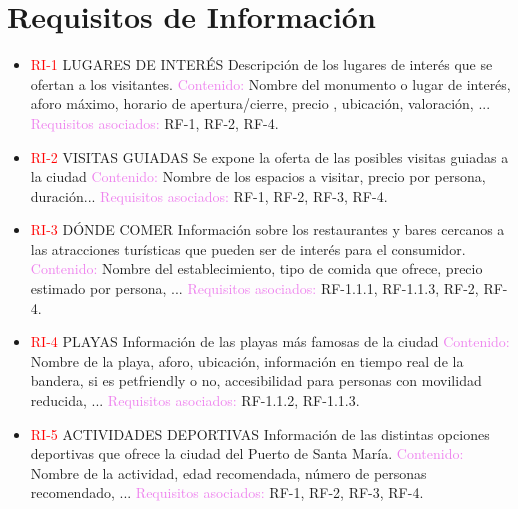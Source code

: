\chapter{Requisitos de Informaci\'on}
\begin{itemize}
    \item \textcolor{red}{RI-1} LUGARES DE INTERÉS \newline
    Descripción de los lugares de interés que se ofertan a los visitantes. \newline
    \textcolor{violet}{Contenido:} Nombre del monumento o lugar de interés, aforo máximo, horario de apertura/cierre, precio , ubicación, valoración, ...\newline
    \textcolor{violet}{Requisitos asociados:} RF-1, RF-2, RF-4.
    \item \textcolor{red}{RI-2} VISITAS GUIADAS \newline
    Se expone la oferta de las posibles visitas guiadas a la ciudad \newline
    \textcolor{violet}{Contenido:} Nombre de los espacios a visitar, precio por persona, duración...\newline
    \textcolor{violet}{Requisitos asociados:} RF-1, RF-2, RF-3, RF-4.
    \item \textcolor{red}{RI-3 } DÓNDE COMER \newline
    Información sobre los restaurantes y bares cercanos a las atracciones turísticas que pueden ser de interés para el consumidor. \newline
    \textcolor{violet}{Contenido:} Nombre del establecimiento, tipo de comida que ofrece, precio estimado por persona, ...\newline
    \textcolor{violet}{Requisitos asociados: } RF-1.1.1, RF-1.1.3, RF-2, RF-4.    
    \item \textcolor{red}{RI-4} PLAYAS \newline
    Informaci\'on de las playas más famosas de la ciudad \newline
    \textcolor{violet}{Contenido:} Nombre de la playa, aforo, ubicación, información en tiempo real de la bandera, si es petfriendly o no, accesibilidad para personas con movilidad reducida, ...\newline
    \textcolor{violet}{Requisitos asociados:} RF-1.1.2, RF-1.1.3. 
    \item \textcolor{red}{RI-5 } ACTIVIDADES DEPORTIVAS \newline
    Informaci\'on de las distintas opciones deportivas que ofrece la ciudad del Puerto de Santa María. \newline
    \textcolor{violet}{Contenido:} Nombre de la actividad, edad recomendada, número de personas recomendado, ...\newline
    \textcolor{violet}{Requisitos asociados:} RF-1, RF-2, RF-3, RF-4.
\end{itemize}